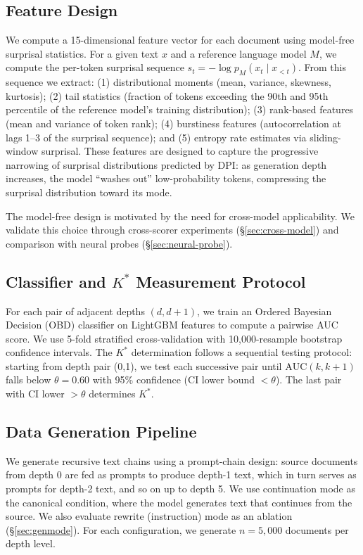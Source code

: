 \documentclass[11pt,a4paper]{article}
\newcommand{\Kstar}{K^{*}}
\begin{document}
\subsection{Feature Design}

We compute a 15-dimensional feature vector for each document using model-free surprisal statistics. For a given text $x$ and a reference language model $M$, we compute the per-token surprisal sequence $s_t = -\log p_M(x_t \mid x_{<t})$. From this sequence we extract: (1) distributional moments (mean, variance, skewness, kurtosis); (2) tail statistics (fraction of tokens exceeding the 90th and 95th percentile of the reference model's training distribution); (3) rank-based features (mean and variance of token rank); (4) burstiness features (autocorrelation at lags 1--3 of the surprisal sequence); and (5) entropy rate estimates via sliding-window surprisal. These features are designed to capture the progressive narrowing of surprisal distributions predicted by DPI: as generation depth increases, the model ``washes out'' low-probability tokens, compressing the surprisal distribution toward its mode.

The model-free design is motivated by the need for cross-model applicability. We validate this choice through cross-scorer experiments (\S\ref{sec:cross-model}) and comparison with neural probes (\S\ref{sec:neural-probe}).

\subsection{Classifier and \texorpdfstring{$\Kstar$}{K*} Measurement Protocol}

For each pair of adjacent depths $(d, d{+}1)$, we train an Ordered Bayesian Decision (OBD) classifier on LightGBM features to compute a pairwise AUC score. We use 5-fold stratified cross-validation with 10,000-resample bootstrap confidence intervals. The $\Kstar$ determination follows a sequential testing protocol: starting from depth pair (0,1), we test each successive pair until $\text{AUC}(k, k{+}1)$ falls below $\theta = 0.60$ with 95\% confidence (CI lower bound $< \theta$). The last pair with CI lower $> \theta$ determines $\Kstar$.

\subsection{Data Generation Pipeline}

We generate recursive text chains using a prompt-chain design: source documents from depth 0 are fed as prompts to produce depth-1 text, which in turn serves as prompts for depth-2 text, and so on up to depth 5. We use continuation mode as the canonical condition, where the model generates text that continues from the source. We also evaluate rewrite (instruction) mode as an ablation (\S\ref{sec:genmode}). For each configuration, we generate $n = 5{,}000$ documents per depth level.
\end{document}
